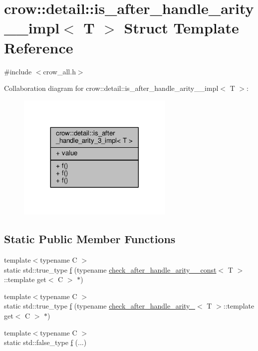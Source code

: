 \hypertarget{structcrow_1_1detail_1_1is__after__handle__arity__3__impl}{\section{crow\-:\-:detail\-:\-:is\-\_\-after\-\_\-handle\-\_\-arity\-\_\-\_\-impl$<$ T $>$ Struct Template Reference}
\label{structcrow_1_1detail_1_1is__after__handle__arity__3__impl}
}


{\ttfamily \#include $<$crow\-\_\-all.\-h$>$}



Collaboration diagram for crow\-:\-:detail\-:\-:is\-\_\-after\-\_\-handle\-\_\-arity\-\_\-\_\-impl$<$ T $>$\-:
\nopagebreak
\begin{figure}[H]
\begin{center}
\leavevmode
\includegraphics[width=212pt]{structcrow_1_1detail_1_1is__after__handle__arity__3__impl__coll__graph}
\end{center}
\end{figure}
\subsection*{Static Public Member Functions}
\begin{DoxyCompactItemize}
\item 
{\footnotesize template$<$typename C $>$ }\\static std\-::true\-\_\-type \hyperlink{structcrow_1_1detail_1_1is__after__handle__arity__3__impl_a4a1a9c3eeb0b9e24070441362f783627}{f} (typename \hyperlink{structcrow_1_1detail_1_1check__after__handle__arity__3__const}{check\-\_\-after\-\_\-handle\-\_\-arity\-\_\-\_\-const}$<$ T $>$\-::template get$<$ C $>$ $\ast$)
\item 
{\footnotesize template$<$typename C $>$ }\\static std\-::true\-\_\-type \hyperlink{structcrow_1_1detail_1_1is__after__handle__arity__3__impl_ae7e76e5b2314d3e3676cb3f05cdf7668}{f} (typename \hyperlink{structcrow_1_1detail_1_1check__after__handle__arity__3}{check\-\_\-after\-\_\-handle\-\_\-arity\-\_}$<$ T $>$\-::template get$<$ C $>$ $\ast$)
\item 
{\footnotesize template$<$typename C $>$ }\\static std\-::false\-\_\-type \hyperlink{structcrow_1_1detail_1_1is__after__handle__arity__3__impl_a33722c5fe5e9c3e6095bfa913bb5ca26}{f} (...)
\end{DoxyCompactItemize}
